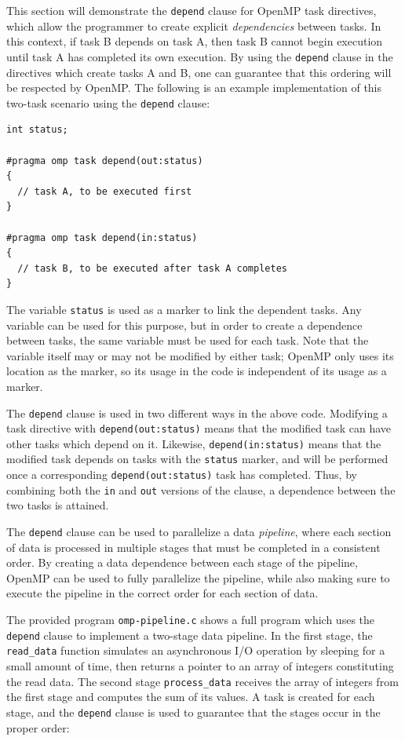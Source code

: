 \documentclass{article}
\theoremstyle{definition}
\begin{document}
This section will demonstrate the \texttt{depend} clause for OpenMP task directives, which allow the programmer to create explicit \emph{dependencies} between tasks. In this context, if task B depends on task A, then task B cannot begin execution until task A has completed its own execution. By using the \texttt{depend} clause in the directives which create tasks A and B, one can guarantee that this ordering will be respected by OpenMP. The following is an example implementation of this two-task scenario using the \texttt{depend} clause:

\begin{verbatim}
int status;

#pragma omp task depend(out:status)
{
  // task A, to be executed first
}

#pragma omp task depend(in:status)
{
  // task B, to be executed after task A completes
}
\end{verbatim}

The variable \texttt{status} is used as a marker to link the dependent tasks. Any variable can be used for this purpose, but in order to create a dependence between tasks, the same variable must be used for each task. Note that the variable itself may or may not be modified by either task; OpenMP only uses its location as the marker, so its usage in the code is independent of its usage as a marker.

The \texttt{depend} clause is used in two different ways in the above code. Modifying a task directive with \texttt{depend(out:status)} means that the modified task can have other tasks which depend on it. Likewise, \texttt{depend(in:status)} means that the modified task depends on tasks with the \texttt{status} marker, and will be performed once a corresponding \texttt{depend(out:status)} task has completed. Thus, by combining both the \texttt{in} and \texttt{out} versions of the clause, a dependence between the two tasks is attained.

The \texttt{depend} clause can be used to parallelize a data \emph{pipeline}, where each section of data is processed in multiple stages that must be completed in a consistent order. By creating a data dependence between each stage of the pipeline, OpenMP can be used to fully parallelize the pipeline, while also making sure to execute the pipeline in the correct order for each section of data.  

The provided program \texttt{omp-pipeline.c} shows a full program which uses the \texttt{depend} clause to implement a two-stage data pipeline. In the first stage, the \texttt{read\_data} function simulates an asynchronous I/O operation by sleeping for a small amount of time, then returns a pointer to an array of integers constituting the read data. The second stage \texttt{process\_data} receives the array of integers from the first stage and computes the sum of its values. A task is created for each stage, and the \texttt{depend} clause is used to guarantee that the stages occur in the proper order:
\end{document}
